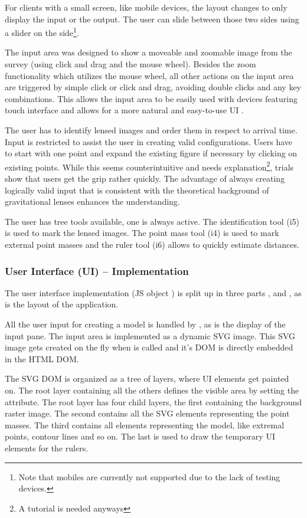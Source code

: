 For clients with a small screen, like mobile devices, the layout changes to only display the input or the output.
The user can slide between those two sides using a slider on the side\footnote{Note that mobiles are currently not supported due to the lack of testing devices.}.

The input area was designed to show a moveable and zoomable image from the survey (using click and drag and the mouse wheel).
Besides the zoom functionality which utilizes the mouse wheel, all other actions on the input area are triggered by simple click or click and drag, avoiding double clicks and any key combinations.
This allows the input area to be easily used with devices featuring touch interface and allows for a more natural and easy-to-use UI \cite{ui-ms, ui-mac}.

The user has to identify lensed images and order them in respect to arrival time.
Input is restricted to assist the user in creating valid configurations.
Users have to start with one point and expand the existing figure if necessary by clicking on existing points.
While this seems counterintuitive and needs explanation\footnote{A tutorial is needed anyways}, trials show that users get the grip rather quickly.
The advantage of always creating logically valid input that is consistent with the theoretical background of gravitational lenses enhances the understanding.

The user has tree tools available, one is always active.
The identification tool (i5) is used to mark the lensed images.
The point mass tool (i4) is used to mark external point masses and the ruler tool (i6) allows to quickly estimate distances.



\subsubsection{User Interface (UI) -- Implementation}
\label{sec:ui-impl}

The user interface implementation (JS object ) is split up in three parts ,  and , as is the layout of the application.

All the user input for creating a model is handled by , as is the display of the input pane.
The input area is implemented as a dynamic SVG image. This SVG image gets created on the fly when  is called and it's DOM is directly embedded in the HTML DOM.

The SVG DOM is organized as a tree of layers, where UI elements get painted on.
The root layer containing all the others defines the visible area by setting the  attribute.
The root layer has four child layers, the first containing the background raster image.
The second contains all the SVG elements representing the point masses.
The third contains all elements representing the model, like extremal points, contour lines and so on.
The last is used to draw the temporary UI elements for the rulers.

